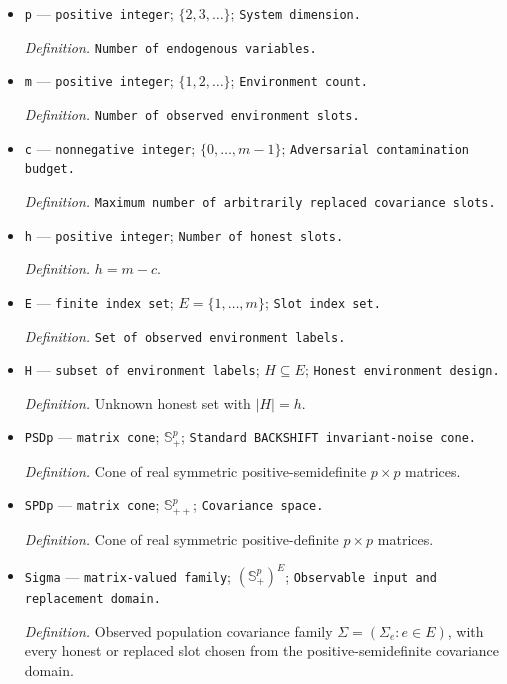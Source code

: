 \documentclass{article}
\begin{document}
\begin{itemize}
  \item \texttt{p} --- \texttt{positive integer}; \(\{2,3,\ldots\}\); \texttt{System dimension.}
  \par\smallskip\noindent\emph{Definition.} \texttt{Number of endogenous variables.}
  \item \texttt{m} --- \texttt{positive integer}; \(\{1,2,\ldots\}\); \texttt{Environment count.}
  \par\smallskip\noindent\emph{Definition.} \texttt{Number of observed environment slots.}
  \item \texttt{c} --- \texttt{nonnegative integer}; \(\{0,\ldots,m-1\}\); \texttt{Adversarial contamination budget.}
  \par\smallskip\noindent\emph{Definition.} \texttt{Maximum number of arbitrarily replaced covariance slots.}
  \item \texttt{h} --- \texttt{positive integer}; \texttt{Number of honest slots.}
  \par\smallskip\noindent\emph{Definition.} \(h=m-c\).
  \item \texttt{E} --- \texttt{finite index set}; \(E=\{1,\ldots,m\}\); \texttt{Slot index set.}
  \par\smallskip\noindent\emph{Definition.} \texttt{Set of observed environment labels.}
  \item \texttt{H} --- \texttt{subset of environment labels}; \(H\subseteq E\); \texttt{Honest environment design.}
  \par\smallskip\noindent\emph{Definition.} Unknown honest set with \(\lvert H\rvert=h\).
  \item \texttt{PSDp} --- \texttt{matrix cone}; \(\mathbb S_{+}^{p}\); \texttt{Standard BACKSHIFT invariant-\allowbreak{}noise cone.}
  \par\smallskip\noindent\emph{Definition.} Cone of real symmetric positive-semidefinite \(p\times p\) matrices.
  \item \texttt{SPDp} --- \texttt{matrix cone}; \(\mathbb S_{++}^{p}\); \texttt{Covariance space.}
  \par\smallskip\noindent\emph{Definition.} Cone of real symmetric positive-definite \(p\times p\) matrices.
  \item \texttt{Sigma} --- \texttt{matrix-\allowbreak{}valued family}; \((\mathbb S_{+}^{p})^{E}\); \texttt{Observable input and replacement domain.}
  \par\smallskip\noindent\emph{Definition.} Observed population covariance family \(\Sigma=(\Sigma_e:e\in E)\), with every honest or replaced slot chosen from the positive-semidefinite covariance domain.

\end{itemize}
\end{document}
